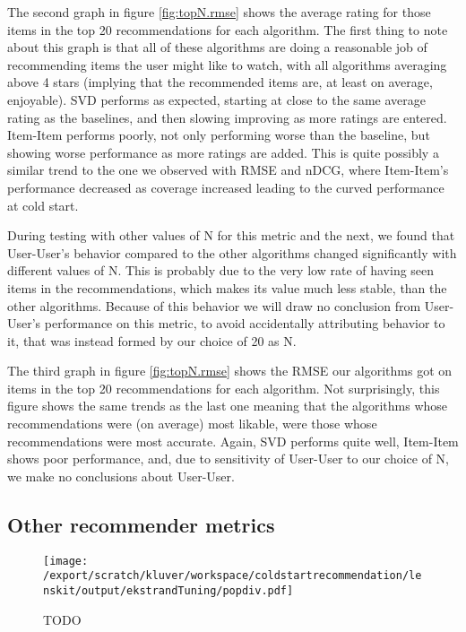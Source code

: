 \documentclass[letterpaper]{sig-alternate}
\begin{document}
  The second graph in figure \ref{fig:topN.rmse} shows the average rating for those items in the top 20 recommendations for each algorithm.
  The first thing to note about this graph is that all of these algorithms are doing a reasonable job of recommending items the user might like to watch, with all algorithms averaging above 4 stars (implying that the recommended items are, at least on average, enjoyable).
  SVD performs as expected, starting at close to the same average rating as the baselines, and then slowing improving as more ratings are entered.
  Item-Item performs poorly, not only performing worse than the baseline, but showing worse performance as more ratings are added.
  This is quite possibly a similar trend to the one we observed with RMSE and nDCG, where Item-Item's performance decreased as coverage increased leading to the curved performance at cold start.
  
  During testing with other values of N for this metric and the next, we found that User-User's behavior compared to the other algorithms changed significantly with different values of N.
  This is probably due to the very low rate of having seen items in the recommendations, which makes its value much less stable, than the other algorithms.
  Because of this behavior we will draw no conclusion from User-User's performance on this metric, to avoid accidentally attributing behavior to it, that was instead formed by our choice of 20 as N.
  
  The third graph in figure \ref{fig:topN.rmse} shows the RMSE our algorithms got on items in the top 20 recommendations for each algorithm.
  Not surprisingly, this figure shows the same trends as the last one meaning that the algorithms whose recommendations were (on average) most likable, were those whose recommendations were most accurate.
  Again, SVD performs quite well, Item-Item shows poor performance, and, due to sensitivity of User-User to our choice of N, we make no conclusions about User-User.

\subsection{Other recommender metrics}

\begin{figure*}[ht!]
  \centering
  \texttt{[image: /export/scratch/kluver/workspace/coldstartrecommendation/lenskit/output/ekstrandTuning/popdiv.pdf]}
  \caption{TODO}
  \label{fig:pop}
\end{figure*}
\end{document}
